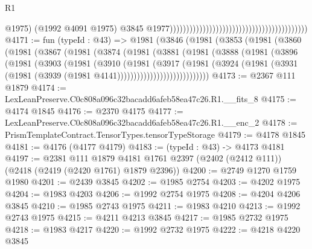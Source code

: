 \begin{lexlean}{R1}
\begin{coremodule}
                                                                                          @1975)
                                                                                        (@1992
                                                                                          @4091
                                                                                          @1975)
                                                                                        @3845
                                                                                        @1977))))))))))))))))))))))))))))))))))))))))))
@4171 := fun (typeId : @43) =>
  @1981
    (@3846
      (@1981
        (@3853
          (@1981
            (@3860
              (@1981
                (@3867
                  (@1981
                    (@3874
                      (@1981
                        (@3881
                          (@1981
                            (@3888
                              (@1981
                                (@3896
                                  (@1981
                                    (@3903
                                      (@1981
                                        (@3910
                                          (@1981
                                            (@3917
                                              (@1981
                                                (@3924
                                                  (@1981
                                                    (@3931
                                                      (@1981
                                                        (@3939
                                                          (@1981 @4141))))))))))))))))))))))))))))
@4173 := @2367 @111 @1879
@4174 := LexLeanPreserve.C0c808a096c32bacadd6afeb58ea47c26.R1.__fits_8
@4175 := @4174 @1845
@4176 := @2370 @4175
@4177 := LexLeanPreserve.C0c808a096c32bacadd6afeb58ea47c26.R1.__enc_2
@4178 := PrismTemplateContract.TensorTypes.tensorTypeStorage
@4179 := @4178 @1845
@4181 := @4176 (@4177 @4179)
@4183 := (typeId : @43) -> @4173 @4181
@4197 := @2381
    @111
    @1879
    @4181
    @1761
    @2397
    (@2402 (@2412 @111))
    (@2418 (@2419 (@2420 @1761) @1879 @2396))
@4200 := @2749 @1270 @1759 @1980
@4201 := @2439 @3845
@4202 := @1985 @2754
@4203 := @4202 @1975
@4204 := @1983 @4203
@4206 := @1992 @2754 @1975
@4208 := @4204 @4206 @3845
@4210 := @1985 @2743 @1975
@4211 := @1983 @4210
@4213 := @1992 @2743 @1975
@4215 := @4211 @4213 @3845
@4217 := @1985 @2732 @1975
@4218 := @1983 @4217
@4220 := @1992 @2732 @1975
@4222 := @4218 @4220 @3845

\end{coremodule}
\end{lexlean}
